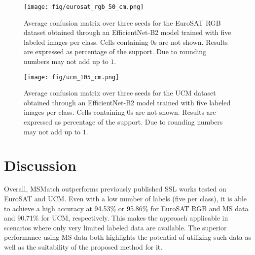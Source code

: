 \documentclass[journal]{IEEEtran}
\begin{document}
\begin{figure}[ht]
\centering
\texttt{[image: fig/eurosat\_rgb\_50\_cm.png]}
\caption{Average confusion matrix over three seeds for the EuroSAT RGB dataset obtained through an EfficientNet-B2 model trained with five labeled images per class. Cells containing 0s are not shown. Results are expressed as percentage of the support. Due to rounding numbers may not add up to $1$.}
\label{fig: eurosat_confusion}
\end{figure}

\begin{figure}[ht]
\centering
\texttt{[image: fig/ucm\_105\_cm.png]}
\caption{Average confusion matrix over three seeds for the UCM dataset obtained through an EfficientNet-B2 model trained with five labeled images per class. Cells containing 0s are not shown. Results are expressed as percentage of the support. Due to rounding numbers may not add up to $1$.}
\label{fig: ucm_confusion}
\end{figure}

\section{Discussion}
Overall, MSMatch outperforms previously published SSL works tested on EuroSAT and UCM. Even with a low number of labels (five per class), it is able to achieve a high accuracy at 94.53\% or 95.86\% for EuroSAT RGB and MS data and 90.71\% for UCM, respectively. This makes the approach applicable in scenarios where only very limited labeled data are available. The superior performance using MS data both highlights the potential of utilizing such data as well as the suitability of the proposed method for it. \\
\end{document}
